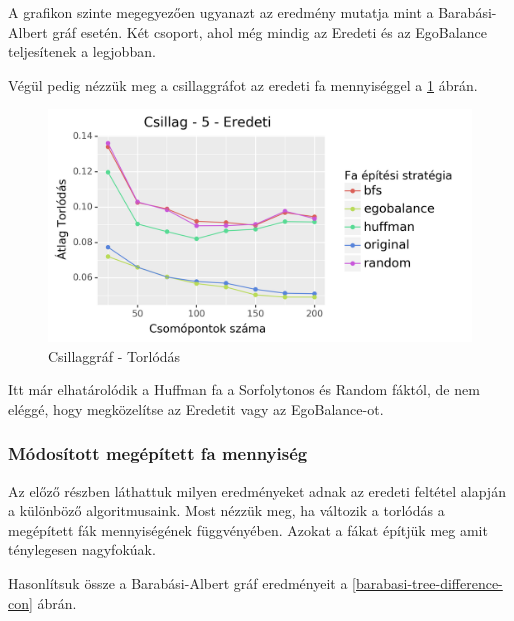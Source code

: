 \documentclass[12pt]{report}
\begin{document}
A grafikon szinte megegyezően ugyanazt az eredmény mutatja mint a Barabási-Albert gráf esetén.
Két csoport, ahol még mindig az Eredeti és az EgoBalance teljesítenek a legjobban.

Végül pedig nézzük meg a csillaggráfot az eredeti fa mennyiséggel a \ref{star-con} ábrán.

\begin{figure}[H]
	\begin{center}
		\includegraphics[width=0.9\linewidth]{pictures/star_con_e.png}
		\caption{Csillaggráf - Torlódás}
		\label{star-con}
	\end{center}
\end{figure}

Itt már elhatárolódik a Huffman fa a Sorfolytonos és Random fáktól, de nem eléggé, hogy megközelítse az Eredetit vagy az EgoBalance-ot.

\subsubsection{Módosított megépített fa mennyiség}

Az előző részben láthattuk milyen eredményeket adnak az eredeti feltétel alapján a különböző algoritmusaink.
Most nézzük meg, ha változik a torlódás a megépített fák mennyiségének függvényében. 
Azokat a fákat építjük meg amit ténylegesen nagyfokúak.

Hasonlítsuk össze a Barabási-Albert gráf eredményeit a \ref{barabasi-tree-difference-con} ábrán.
\end{document}
